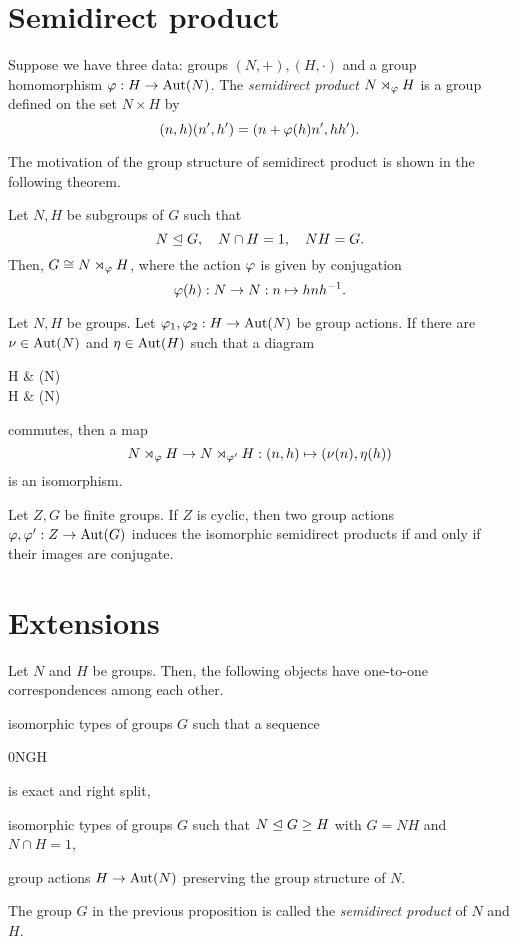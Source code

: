 \documentclass{../note}
\begin{document}
\section{Semidirect product}
\begin{defn}
Suppose we have three data: groups $(N,+),(H,\cdot)$ and a group homomorphism $\varphi:H\to\operatorname{Aut}(N)$.
The \emph{semidirect product} $N\rtimes_\varphi H$ is a group defined on the set $N\times H$ by
\[(n,h)(n',h')=(n+\varphi(h)n',hh').\]
\end{defn}
The motivation of the group structure of semidirect product is shown in the following theorem.
\begin{thm}
Let $N,H$ be subgroups of $G$ such that
\[N\trianglelefteq G,\quad N\cap H=1,\quad NH=G.\]
Then, $G\cong N\rtimes_\varphi H$, where the action $\varphi$ is given by conjugation
\[\varphi(h):N\to N:n\mapsto hnh^{-1}.\]
\end{thm}




\begin{lem}
Let $N,H$ be groups.
Let $\varphi_1,\varphi_2:H\to\operatorname{Aut}(N)$ be group actions.
If there are $\nu\in\operatorname{Aut}(N)$ and $\eta\in\operatorname{Aut}(H)$ such that a diagram
\begin{cd}
H  & \Aut(N) \\
H  & \Aut(N)
\end{cd}
commutes, then a map
\[N\rtimes_\varphi H\to N\rtimes_{\varphi'}H:(n,h)\mapsto(\nu(n),\eta(h))\]
is an isomorphism.
\end{lem}
\begin{lem}
Let $Z,G$ be finite groups.
If $Z$ is cyclic, then two group actions $\varphi,\varphi':Z\to\operatorname{Aut}(G)$ induces the isomorphic semidirect products if and only if their images are conjugate.
\end{lem}


\section{Extensions}

\begin{prop}
Let $N$ and $H$ be groups.
Then, the following objects have one-to-one correspondences among each other.
\begin{parts}
\item isomorphic types of groups $G$ such that a sequence \begin{es}0\>N\>G\>H\end{es} is exact and right split,
\item isomorphic types of groups $G$ such that $N\trianglelefteq G\ge H$ with $G=NH$ and $N\cap H=1$,
\item group actions $H\to\operatorname{Aut}(N)$ preserving the group structure of $N$.
\end{parts}
\end{prop}
\begin{defn}
The group $G$ in the previous proposition is called the \emph{semidirect product} of $N$ and $H$.
\end{defn}
\end{document}
